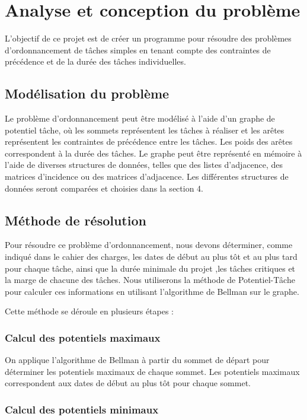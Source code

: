 \documentclass{article}
\begin{document}
\section{Analyse et conception du problème}

L'objectif de ce projet est de créer un programme pour résoudre des problèmes d'ordonnancement de tâches simples en tenant compte des contraintes de précédence et de la durée des tâches individuelles. 

\subsection{Modélisation du problème}

Le problème d'ordonnancement peut être modélisé à l'aide d'un graphe de potentiel tâche, où les sommets représentent les tâches à réaliser et les arêtes représentent les contraintes de précédence entre les tâches. Les poids des arêtes correspondent à la durée des tâches. Le graphe peut être représenté en mémoire à l'aide de diverses structures de données, telles que des listes d'adjacence, des matrices d'incidence ou des matrices d'adjacence. Les différentes structures de données seront comparées et choisies dans la section 4.

\subsection{Méthode de résolution}

Pour résoudre ce problème d'ordonnancement, nous devons déterminer, comme indiqué dans le cahier des charges, les dates de début au plus tôt et au plus tard pour chaque tâche, ainsi que la durée minimale du projet ,les tâches critiques et la marge de chacune des tâches. Nous utiliserons la méthode de Potentiel-Tâche pour calculer ces informations en utilisant l'algorithme de Bellman sur le graphe.

Cette méthode se déroule en plusieurs étapes :

\subsubsection{Calcul des potentiels maximaux}

On applique l'algorithme de Bellman à partir du sommet de départ pour déterminer les potentiels maximaux de chaque sommet. Les potentiels maximaux correspondent aux dates de début au plus tôt pour chaque sommet.

\subsubsection{Calcul des potentiels minimaux}
\end{document}
